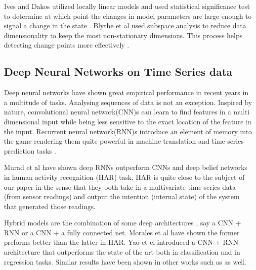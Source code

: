Ives and Dakos utilized locally linear models and used statistical significance test to determine at which point the changes in model parameters are large enough to signal a change in the state \cite{Ives2012}. Blythe et al used subspace analysis to reduce data dimensionality to keep the most non-stationary dimensions. This process helps detecting change points more effectively \cite{Blythe2012}. 



\subsection{Deep Neural Networks on Time Series data}
Deep neural networks have shown great empirical performance in recent years in a multitude of tasks. 
Analysing sequences of data is not an exception. Inspired by nature, convolutional neural network(CNN)s can learn to find features in a multi dimensional input while being less sensitive to the exact location of the feature in the input. \cite{lecun2015deep} Recurrent neural network(RNN)s introduce an element of memory into the game rendering them quite powerful in machine translation and time series prediction tasks \cite{cho2014learning, zhang2000predicting}.

Murad et al \cite{murad2017deep} have shown deep RNNs outperform CNNs and deep belief networks in human activity recognition (HAR) task. HAR is quite close to the subject of our paper in the sense that they both take in a multivariate time series data (from sensor readings) and output the intention (internal state) of the system that generated those readings. 

Hybrid models are the combination of some deep architectures \cite{wang2019deep}, say a CNN + RNN or a CNN + a fully connected net. Morales et al have shown the former preforms better than the latter in HAR\cite{morales2016deep}. Yao et el \cite{deepsense} introduced a CNN + RNN architecture that outperforms the state of the art both in  classification and in regression tasks. Similar results have been shown in other works such as \cite{Ordonez2016, singh2017transforming, zheng2016exploiting} as well.
